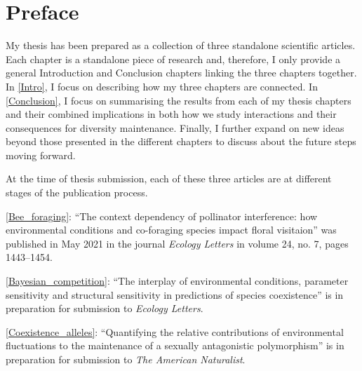 

\chapter*{Preface} %
My thesis has been prepared as a collection of three standalone scientific articles. Each chapter is a standalone piece of research and, therefore, I only provide a general Introduction and Conclusion chapters linking the three chapters together. In  \autoref{Intro}, I focus on describing how my three chapters are connected. In \autoref{Conclusion}, I focus on summarising the results from each of my thesis chapters and their combined implications in both how we study interactions and their consequences for diversity maintenance. Finally, I further expand on new ideas beyond those presented in the different chapters to discuss about the future steps moving forward.


At the time of thesis submission, each of these three articles are at different stages of the publication process.

\autoref{Bee_foraging}: ``The context dependency of pollinator interference: how environmental conditions and co-foraging species impact floral visitaion'' was published in May 2021 in the journal \textit{Ecology Letters} in volume 24, no. 7, pages 1443--1454.

\autoref{Bayesian_competition}: ``The interplay of environmental conditions, parameter sensitivity and structural sensitivity in predictions of species coexistence'' is in preparation for submission to \textit{Ecology Letters}.

\autoref{Coexistence_alleles}: ``Quantifying the relative contributions of environmental fluctuations to the maintenance of a sexually antagonistic polymorphism'' is in preparation for submission to \textit{The American Naturalist}.



